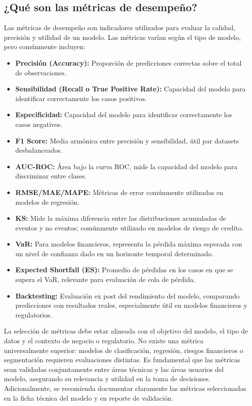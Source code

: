 \documentclass[11pt,oneside]{article}%
\begin{document}
\subsection{¿Qué son las métricas de desempeño?}
Las métricas de desempeño son indicadores utilizados para evaluar la calidad, precisión y utilidad de un modelo. Las métricas varían según el tipo de modelo, pero comúnmente incluyen: 
\begin{itemize}
\item \textbf{Precisión (Accuracy):} Proporción de predicciones correctas sobre el total de observaciones. 
\item \textbf{Sensibilidad (Recall o True Positive Rate):} Capacidad del modelo para identificar correctamente los casos positivos. 
\item \textbf{Especificidad:}  Capacidad del modelo para identificar correctamente los casos negativos. 
\item \textbf{F1 Score:} Media armónica entre precisión y sensibilidad, útil par datasets desbalanceados. 
\item \textbf{AUC-ROC:} Área bajo la curva ROC, mide la capacidad del modelo para discriminar entre clases. 
\item \textbf{RMSE/MAE/MAPE:} Métricas de error comúnmente utilizadas en modelos de regresión. 
\item \textbf{KS:} Mide la máxima diferencia entre las distribuciones acumuladas de eventos y no eventos; comúnmente utilizado en modelos de riesgo de credito. 
\item \textbf{VaR:} Para modelos financieros, representa la pérdida máxima esperada con un nivel de confianza dado en un horizonte temporal determinado. 
\item \textbf{Expected Shortfall (ES):} Promedio de pérdidas en los casos en que se supera el VaR, relevante para evaluación de cola de pérdida. 
\item \textbf{Backtesting:} Evaluación ex post del rendimiento del modelo, comparando predicciones con resultados reales, especialmente útil en modelos financieros y regulatorios. 
\end{itemize}

La selección de métricas debe estar alineada con el objetivo del modelo, el tipo de datos y el contexto de negocio o regulatorio. No existe una métrica universalmente superior: modelos de clasificación, regresión, riesgos financieros o segmentación requieren evaluaciones distintas. Es fundamental que las métricas sean validadas conjuntamente entre áreas técnicas y las áreas usuarios del modelo, asegurando su relevancia y utilidad en la toma de decisiones. Adicionalmente, se recomienda documentar claramente las métricas seleccionadas en la ficha técnica del modelo y en reporte de validación. 
\end{document}
